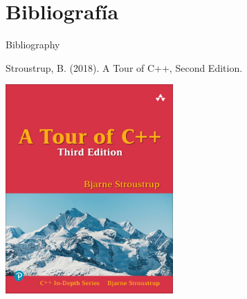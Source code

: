 \documentclass{beamer}
\begin{document}
\section{Bibliografía}

\begin{frame}{Bibliography}

Stroustrup, B. (2018). A Tour of C++, Second Edition.


\begin{center}
      \includegraphics[height=8cm]{Tour3English-large.jpg}

\end{center}
    
\end{frame}
\end{document}
